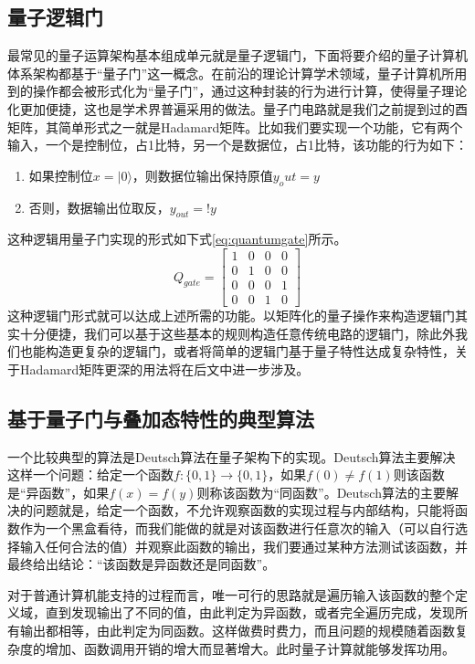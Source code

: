 \documentclass[UTF8, 11pt, a4paper]{ctexart}
\begin{document}
\subsection{量子逻辑门}

最常见的量子运算架构基本组成单元就是量子逻辑门，下面将要介绍的量子计算机体系架构都基于“量子门”这一概念。在前沿的理论计算学术领域，量子计算机所用到的操作都会被形式化为“量子门”，通过这种封装的行为进行计算，使得量子理论化更加便捷，这也是学术界普遍采用的做法。量子门电路就是我们之前提到过的酉矩阵，其简单形式之一就是Hadamard矩阵。比如我们要实现一个功能，它有两个输入，一个是控制位，占1比特，另一个是数据位，占1比特，该功能的行为如下：
\begin{enumerate}
  \item 如果控制位$x=|0\rangle$，则数据位输出保持原值$y_out = y$
  \item  否则，数据输出位取反，$y_{out} = ! y$
\end{enumerate}
这种逻辑用量子门实现的形式如下式\ref{eq:quantumgate}所示。
\begin{equation}
\label{eq:quantumgate}
Q_{gate} = \left[\begin{array}{cccc}1 & 0 & 0 & 0 \\0 & 1 & 0 & 0 \\0 & 0 & 0 & 1 \\0 & 0 & 1 & 0\end{array}\right]
\end{equation}
这种逻辑门形式就可以达成上述所需的功能。以矩阵化的量子操作来构造逻辑门其实十分便捷，我们可以基于这些基本的规则构造任意传统电路的逻辑门，除此外我们也能构造更复杂的逻辑门，或者将简单的逻辑门基于量子特性达成复杂特性，关于Hadamard矩阵更深的用法将在后文中进一步涉及。

\subsection{基于量子门与叠加态特性的典型算法}

一个比较典型的算法是Deutsch算法在量子架构下的实现。Deutsch算法主要解决这样一个问题：给定一个函数$f : \{0,1\} \rightarrow \{0,1\}$，如果$f(0) \ne f(1)$则该函数是“异函数”，如果$f(x)=f(y)$则称该函数为“同函数”。Deutsch算法的主要解决的问题就是，给定一个函数，不允许观察函数的实现过程与内部结构，只能将函数作为一个黑盒看待，而我们能做的就是对该函数进行任意次的输入（可以自行选择输入任何合法的值）并观察此函数的输出，我们要通过某种方法测试该函数，并最终给出结论：“该函数是异函数还是同函数”。

对于普通计算机能支持的过程而言，唯一可行的思路就是遍历输入该函数的整个定义域，直到发现输出了不同的值，由此判定为异函数，或者完全遍历完成，发现所有输出都相等，由此判定为同函数。这样做费时费力，而且问题的规模随着函数复杂度的增加、函数调用开销的增大而显著增大。此时量子计算就能够发挥功用。
\end{document}
